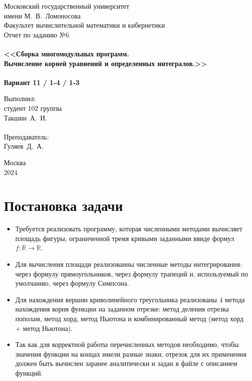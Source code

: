 \documentclass[a4paper,12pt,titlepage,finall]{article}
\begin{document}
\begin{titlepage}
    \begin{center}
	{\small \sc Московский государственный университет \\имени М.~В.~Ломоносова\\
	Факультет вычислительной математики и кибернетики\\}
	\vfill
	{\Large \sc Отчет по заданию №6}\\
	~\\
	{\large \bf <<Сборка многомодульных программ. \\
	Вычисление корней уравнений и определенных интегралов.>>}\\ 
	~\\
	{\large \bf Вариант 11 / 1-4 / 1-3}
    \end{center}
    \begin{flushright}
	\vfill {Выполнил:\\
	студент 102 группы\\
	Такшин~А.~И.\\
	~\\
	Преподаватель:\\
	Гуляев~Д.~А.}
    \end{flushright}
    \begin{center}
	\vfill
	{\small Москва\\2024}
    \end{center}
\end{titlepage}

\tableofcontents
\newpage

\section{Постановка задачи}
\begin{itemize}
  \item Требуется реализовать программу, которая численными методами вычисляет
    площадь фигуры, ограниченной тремя кривыми заданными ввиде формул 
    $f:\mathbb{R} \rightarrow \mathbb{R}$.
\item Для вычисления площади реализованны численные методы интегрирования: через формулу прямоугольников, через формулу трапеций и, используемый по умолчанию, через формулу Симпсона.
\item Для нахождения вершин криволинейного треугольника реализованы 4 метода нахождения корня функции на заданном отрезке: метод деления отрезка пополам, метод хорд, метод Ньютона и комбинированный метод (метод хорд + метод Ньютона).
\item Так как для корректной работы перечисленных методов необходимо, чтобы значения функции на концах имели разные знаки, отрезок для их применения должен быть вычислен заранее аналитически и задан в файле с описанием функций.
\end{itemize}
\end{document}
